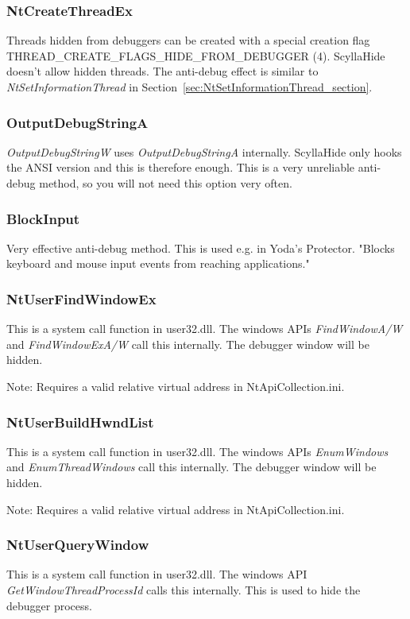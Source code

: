 \documentclass[10pt,a4paper]{article}
\begin{document}
\subsubsection{NtCreateThreadEx}
Threads hidden from debuggers can be created with a special creation flag THREAD\_CREATE\_FLAGS\_HIDE\_FROM\_DEBUGGER (4). ScyllaHide doesn't allow hidden threads. The anti-debug effect is similar to \textit{NtSetInformationThread} in Section~\ref{sec:NtSetInformationThread_section}.

\subsubsection{OutputDebugStringA}
\textit{OutputDebugStringW} uses \textit{OutputDebugStringA} internally. ScyllaHide only hooks the ANSI version and this is therefore enough. This is a very unreliable anti-debug method, so you will not need this option very often.

\subsubsection{BlockInput}
Very effective anti-debug method. This is used e.g. in Yoda's Protector. "Blocks keyboard and mouse input events from reaching applications."

\subsubsection{NtUserFindWindowEx}
This is a system call function in user32.dll. The windows APIs \textit{FindWindowA/W} and \textit{FindWindowExA/W} call this internally. The debugger window will be hidden.

Note: Requires a valid relative virtual address in NtApiCollection.ini.

\subsubsection{NtUserBuildHwndList}
This is a system call function in user32.dll. The windows APIs \textit{EnumWindows} and \textit{EnumThreadWindows} call this internally. The debugger window will be hidden.

Note: Requires a valid relative virtual address in NtApiCollection.ini.

\subsubsection{NtUserQueryWindow}
This is a system call function in user32.dll. The windows API \textit{GetWindowThreadProcessId} calls this internally. This is used to hide the debugger process.
\end{document}
